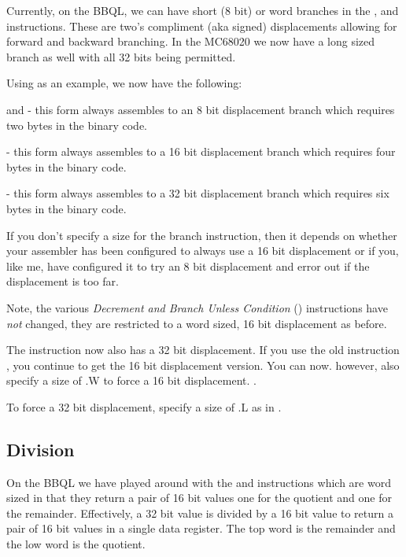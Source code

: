 Currently, on the BBQL, we can have short (8 bit) or word branches in the ,  and  instructions. These are two's compliment (aka signed) displacements allowing for forward and backward branching. In the MC68020 we now have a long sized branch as well with all 32 bits being permitted.

Using  as an example, we now have the following:

 and  - this form always assembles to an 8 bit displacement branch which requires two bytes in the binary code.

 - this form always assembles to a 16 bit displacement branch which requires four bytes in the binary code.

 - this form always assembles to a 32 bit displacement branch which requires six bytes in the binary code.

If you don't specify a size for the branch instruction, then it depends on whether your assembler has been configured to always use a 16 bit displacement or if you, like me, have configured it to try an 8 bit displacement and error out if the displacement is too far.

Note, the various \emph{Decrement and Branch Unless Condition} () instructions have \emph{not} changed, they are restricted to a word sized, 16 bit displacement as before.

The  instruction now also has a 32 bit displacement. If you use the old instruction , you continue to get the 16 bit displacement version. You can now. however, also specify a size of .W to force a 16 bit displacement. .

To force a 32 bit displacement, specify a size of .L as in .

\subsection{Division}

On the BBQL we have played around with the  and  instructions which are word sized in that they return a pair of 16 bit values one for the quotient and one for the remainder. Effectively, a 32 bit value is divided by a 16 bit value to return a pair of 16 bit values in a single data register. The top word is the remainder and the low word is the quotient.

